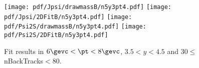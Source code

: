 \begin{figure}[H]
\begin{center}
\texttt{[image: pdf/Jpsi/drawmassB/n5y3pt4.pdf]}
\texttt{[image: pdf/Jpsi/2DFitB/n5y3pt4.pdf]}
\vspace*{-0.5cm}
\texttt{[image: pdf/Psi2S/drawmassB/n5y3pt4.pdf]}
\texttt{[image: pdf/Psi2S/2DFitB/n5y3pt4.pdf]}
\vspace*{-0.5cm}
\end{center}
\caption{Fit results in $6\gevc<\pt<8\gevc$, $3.5<y<4.5$ and 30$\leq$nBackTracks$<$80.}
\label{Fitn5y3pt4}
\end{figure}
